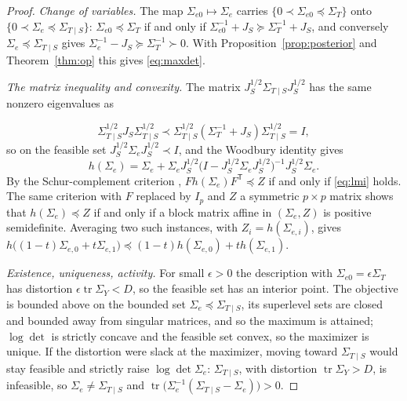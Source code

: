 \documentclass[11pt,onecolumn]{IEEEtran}
\newcommand{\tr}{\operatorname{tr}}
\begin{document}
\begin{proof}
\emph{Change of variables.} The map $\Sigma_{e0}\mapsto\Sigma_e$ carries
$\{0\prec\Sigma_{e0}\preceq\Sigma_T\}$ onto
$\{0\prec\Sigma_e\preceq\Sigma_{T\mid S}\}$: $\Sigma_{e0}\preceq\Sigma_T$ if
and only if $\Sigma_{e0}^{-1}+J_S\succeq\Sigma_T^{-1}+J_S$, and conversely
$\Sigma_e\preceq\Sigma_{T\mid S}$ gives
$\Sigma_e^{-1}-J_S\succeq\Sigma_T^{-1}\succ0$. With
Proposition~\ref{prop:posterior} and Theorem~\ref{thm:op} this gives
\eqref{eq:maxdet}.

\emph{The matrix inequality and convexity.} The matrix
$J_S^{1/2}\Sigma_{T\mid S}J_S^{1/2}$ has the same nonzero eigenvalues as

\[
\Sigma_{T\mid S}^{1/2}J_S\Sigma_{T\mid S}^{1/2}\prec
\Sigma_{T\mid S}^{1/2}(\Sigma_T^{-1}+J_S)\Sigma_{T\mid S}^{1/2}=I,
\]
so on
the feasible set $J_S^{1/2}\Sigma_eJ_S^{1/2}\prec I$, and the Woodbury
identity gives
\[
h(\Sigma_e)=\Sigma_e+\Sigma_eJ_S^{1/2}\bigl(I-J_S^{1/2}\Sigma_eJ_S^{1/2}\bigr)^{-1}
J_S^{1/2}\Sigma_e .
\]
By the Schur-complement criterion \cite[Sec.~A.5.5]{boyd2004},
$Fh(\Sigma_e)F^{\mathsf T}\preceq Z$ if and only if \eqref{eq:lmi} holds.
The same criterion with $F$ replaced by $I_p$ and $Z$ a symmetric
$p\times p$ matrix shows that $h(\Sigma_e)\preceq Z$ if and only if a block
matrix affine in $(\Sigma_e,Z)$ is positive semidefinite. Averaging two
such instances, with $Z_i=h(\Sigma_{e,i})$, gives
$h\bigl((1-t)\Sigma_{e,0}+t\Sigma_{e,1}\bigr)\preceq(1-t)h(\Sigma_{e,0})+th(\Sigma_{e,1})$.

\emph{Existence, uniqueness, activity.} For small $\epsilon>0$ the
description with $\Sigma_{e0}=\epsilon\Sigma_T$ has distortion
$\epsilon\tr\Sigma_Y<D$, so the feasible set has an interior point. The
objective is bounded above on the bounded set
$\Sigma_e\preceq\Sigma_{T\mid S}$, its superlevel sets are closed and
bounded away from singular matrices, and so the maximum is attained;
$\log\det$ is strictly concave and the feasible set convex, so the
maximizer is unique. If the distortion were slack at the maximizer,
moving toward $\Sigma_{T\mid S}$ would stay feasible and strictly raise
$\log\det\Sigma_e$: $\Sigma_{T\mid S}$, with distortion $\tr\Sigma_Y>D$, is
infeasible, so $\Sigma_e\ne\Sigma_{T\mid S}$ and
$\tr\bigl(\Sigma_e^{-1}(\Sigma_{T\mid S}-\Sigma_e)\bigr)>0$.


\end{proof}
\end{document}
